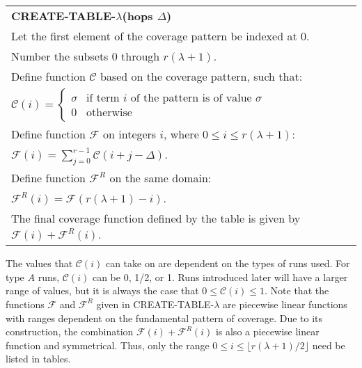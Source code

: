 \documentclass[11pt]{article}
\newcommand{\tab}{\hspace{.25in}}
\begin{document}
\begin{table}[!hbt]
\begin{tabular}{l}
\smallskip \\
\toprule
\textbf{CREATE-TABLE-$\lambda$(hops $\Delta$)} \\
\midrule
\tab Let the first element of the coverage pattern be indexed at 0.\\
\tab Number the subsets 0 through $r(\lambda + 1)$.\\
\tab Define function $\mathcal{C}$ based on the coverage pattern, such that:\\
\tab \tab $\mathcal{C}(i) = \left\{ \begin{array}{ll}
\sigma&\mbox{if term }i\mbox{ of the pattern is of value }\sigma\\ 
0&\mbox{otherwise}
\end{array} \right.$ \\
\tab Define function ${\mathcal F}$ on integers $i$, where $0 \leq i \leq r(\lambda + 1)$:\\
\tab \tab ${\mathcal F}(i) = \sum_{j = 0}^{r - 1} \mathcal{C}(i + j - \Delta)$.\\
\tab Define function ${\mathcal F}^R$ on the same domain:\\
\tab \tab ${\mathcal F}^R(i) = {\mathcal F}(r(\lambda + 1) - i)$.\\
\tab The final coverage function defined by the table is given by ${\mathcal F}(i) + {\mathcal F}^R(i)$.\\
\bottomrule
\end{tabular}
\end{table}

The values that $\mathcal{C}(i)$ can take on are dependent on the types of runs used.  For type $A$ runs, $\mathcal{C}(i)$ can be 0, 1/2, or 1.  Runs introduced later will have a larger range of values, but it is always the case that $0 \leq \mathcal{C}(i) \leq 1$.  Note that the functions $\mathcal{F}$ and $\mathcal{F}^R$ given in CREATE-TABLE-$\lambda$ are piecewise linear functions with ranges dependent on the fundamental pattern of coverage.  Due to its construction, the combination ${\mathcal F}(i) + {\mathcal F}^R(i)$ is also a piecewise linear function and symmetrical.  Thus, only the range $0 \leq i \leq \lfloor r(\lambda + 1)/2 \rfloor$ need be listed in tables.\\
\end{document}
